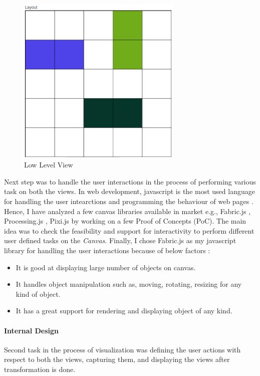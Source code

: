 \begin{figure}
	\includegraphics[width=0.7\textwidth]{figures/Lowlevel_View}
	\caption{Low Level View}
	\label{fig:LowLevel_View}
\end{figure}

Next step was to handle the user interactions in the process of performing various task on both the views. In web development, javascript is the most used language for handling the user intearctions and programming the behaviour of web pages \cite{javascript}. Hence, I have analyzed a few canvas libraries available in market e.g., Fabric.js \cite{fabricjs}, Processing.js \cite{processingjs}, Pixi.js \cite{pixijs}  by working on a few Proof of Concepts (PoC). The main idea was to check the feasibility and support for interactivity to perform different user defined tasks on the \textit{Canvas}. Finally, I chose Fabric.js as my javascript library for handling the user interactions because of below factors \cite{fabricjs}:
\begin{itemize}
	\item {It is good at displaying large number of objects on canvas.}
	\item {It handles object manipulation such as, moving, rotating, resizing for any kind of object.}
	\item {It has a great support for rendering and displaying object of any kind.}
\end{itemize}

\paragraph{Internal Design}
Second task in the process of visualization was defining the user actions with respect to both the views, capturing them, and displaying the views after transformation is done.

